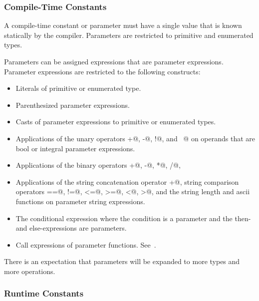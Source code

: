 \subsubsection{Compile-Time Constants}
\label{Compile-Time_Constants}

A compile-time constant or parameter must have a single value that is
known statically by the compiler.  Parameters are restricted to
primitive and enumerated types.

Parameters can be assigned expressions that are parameter expressions.
Parameter expressions are restricted to the following constructs:
\begin{itemize}
\item
 Literals of primitive or enumerated type.
\item
 Parenthesized parameter expressions.
\item
 Casts of parameter expressions to primitive or enumerated types.
\item
 Applications of the unary operators \verb@+@, \verb@-@, \verb@!@,
 and \verb@~@ on operands that are bool or integral parameter
 expressions.
\item
 Applications of the binary operators \verb@+@, \verb@-@, \verb@*@, \verb@/@, \verb@%@, \verb@**@, \verb@&&@, \verb@||@, \verb@&@, \verb@|@, \verb@^@, \verb@<<@, \verb@>>@, \verb@==@, \verb@!=@, \verb@<=@, \verb@>=@, \verb@<@, and \verb@>@ on operands that are bool or integral parameter expressions.
\item
 Applications of the string concatenation operator \verb@+@, string comparison operators \verb@==@, \verb@!=@, \verb@<=@, \verb@>=@, \verb@<@, \verb@>@, and the string length and ascii functions on parameter string expressions.
\item
 The conditional expression where the condition is a parameter and the
 then- and else-expressions are parameters.
\item
 Call expressions of parameter functions.  See~.
\end{itemize}

There is an expectation that parameters will be expanded to more types
and more operations.

\subsubsection{Runtime Constants}
\label{Runtime_Constants}

